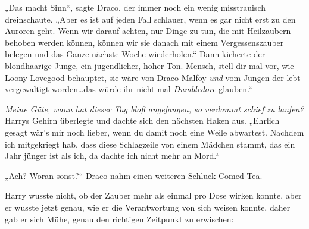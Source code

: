 „Das macht Sinn“, sagte Draco, der immer noch ein wenig misstrauisch dreinschaute.
„Aber es ist auf jeden Fall schlauer, wenn es gar nicht erst zu den Auroren geht. Wenn wir darauf achten, nur Dinge zu tun, die mit Heilzaubern behoben werden können, können wir sie danach mit einem Vergessenszauber belegen und das Ganze nächste Woche wiederholen.“
Dann kicherte der blondhaarige Junge, ein jugendlicher, hoher Ton.
Mensch, stell dir mal vor, wie Loony Lovegood behauptet, sie wäre von Draco Malfoy \emph{und} vom Jungen-der-lebt vergewaltigt worden…das würde ihr nicht mal \emph{Dumbledore} glauben.“


\emph{Meine Güte, wann hat dieser Tag bloß angefangen, so verdammt schief zu laufen?} Harrys Gehirn überlegte und dachte sich den nächsten Haken aus. „Ehrlich gesagt wär’s mir noch lieber, wenn du damit noch eine Weile abwartest. Nachdem ich mitgekriegt hab, dass diese Schlagzeile von einem Mädchen stammt, das ein Jahr jünger ist als ich, da dachte ich nicht mehr an Mord.“

„Ach? Woran sonst?“ Draco nahm einen weiteren Schluck Comed-Tea.

Harry wusste nicht, ob der Zauber mehr als einmal pro Dose wirken konnte, aber er wusste jetzt genau, wie er die Verantwortung von sich weisen konnte, daher gab er sich Mühe, genau den richtigen Zeitpunkt zu erwischen:

